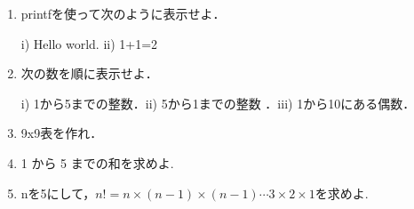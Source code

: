 \begin{enumerate}
\item printfを使って次のように表示せよ．

i) Hello world. ii) 1+1=2
\item 次の数を順に表示せよ．

i) 1から5までの整数．ii) 5から1までの整数 ．iii) 1から10にある偶数．

\item 9x9表を作れ．
\item 1 から 5 までの和を求めよ.
\item nを5にして，$n!=n \times (n-1) \times (n-1) \cdots 3 \times 2 \times 1$を求めよ.
\end{enumerate}
